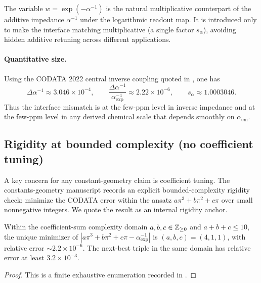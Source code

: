 \begin{remark}[Why the weight variable \texorpdfstring{$w=\exp(-\alpha^{-1})$}{w=exp(-alpha^{-1})}]
The variable $w=\exp(-\alpha^{-1})$ is the natural multiplicative counterpart of the additive impedance $\alpha^{-1}$ under the logarithmic readout map. It is introduced only to make the interface matching multiplicative (a single factor $s_\alpha$), avoiding hidden additive retuning across different applications.
\end{remark}

\paragraph{Quantitative size.}
Using the CODATA 2022 central inverse coupling quoted in \cite{Ma2025PCG,CODATA2022RMP}, one has
\[
\Delta\alpha^{-1}\approx 3.046\times 10^{-4},
\qquad
\frac{\Delta\alpha^{-1}}{\alpha_{\mathrm{exp}}^{-1}}\approx 2.22\times 10^{-6},
\qquad
s_\alpha\approx 1.0003046.
\]
Thus the interface mismatch is at the few-ppm level in inverse impedance and at the few-ppm level in any derived chemical scale that depends smoothly on $\alpha_{\mathrm{em}}$.

\subsection{Rigidity at bounded complexity (no coefficient tuning)}
A key concern for any constant-geometry claim is coefficient tuning. The constants-geometry manuscript records an explicit bounded-complexity rigidity check: minimize the CODATA error within the ansatz $a\pi^3+b\pi^2+c\pi$ over small nonnegative integers. We quote the result as an internal rigidity anchor.
\begin{proposition}\label{prop:alpha_rigidity_chem}
Within the coefficient-sum complexity domain $a,b,c\in\mathbb{Z}_{\ge 0}$ and $a+b+c\le 10$, the unique minimizer of
$|a\pi^3+b\pi^2+c\pi-\alpha_{\mathrm{exp}}^{-1}|$
is $(a,b,c)=(4,1,1)$, with relative error $\sim 2.2\times 10^{-6}$. The next-best triple in the same domain has relative error at least $3.2\times 10^{-3}$.
\end{proposition}
\begin{proof}
This is a finite exhaustive enumeration recorded in \cite{Ma2025PCG}.
\end{proof}


